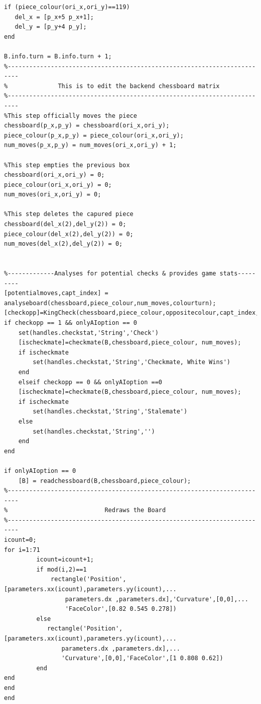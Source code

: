 \documentclass[11pt,a4paper]{article}
\begin{document}
\begin{lstlisting}
if (piece_colour(ori_x,ori_y)==119)    
   del_x = [p_x+5 p_x+1];
   del_y = [p_y+4 p_y];
end
            
B.info.turn = B.info.turn + 1;
%-------------------------------------------------------------------------
%              This is to edit the backend chessboard matrix
%-------------------------------------------------------------------------
%This step officially moves the piece
chessboard(p_x,p_y) = chessboard(ori_x,ori_y);
piece_colour(p_x,p_y) = piece_colour(ori_x,ori_y);
num_moves(p_x,p_y) = num_moves(ori_x,ori_y) + 1;

%This step empties the previous box
chessboard(ori_x,ori_y) = 0;
piece_colour(ori_x,ori_y) = 0;
num_moves(ori_x,ori_y) = 0;

%This step deletes the capured piece
chessboard(del_x(2),del_y(2)) = 0;
piece_colour(del_x(2),del_y(2)) = 0;
num_moves(del_x(2),del_y(2)) = 0;


%-------------Analyses for potential checks & provides game stats---------
[potentialmoves,capt_index] = analyseboard(chessboard,piece_colour,num_moves,colourturn);
[checkopp]=KingCheck(chessboard,piece_colour,oppositecolour,capt_index,potentialmoves);
if checkopp == 1 && onlyAIoption == 0
    set(handles.checkstat,'String','Check')
    [ischeckmate]=checkmate(B,chessboard,piece_colour, num_moves);
    if ischeckmate
        set(handles.checkstat,'String','Checkmate, White Wins')
    end
    elseif checkopp == 0 && onlyAIoption ==0
    [ischeckmate]=checkmate(B,chessboard,piece_colour, num_moves);
    if ischeckmate
        set(handles.checkstat,'String','Stalemate')
    else
        set(handles.checkstat,'String','')
    end
end

if onlyAIoption == 0
    [B] = readchessboard(B,chessboard,piece_colour);
%-------------------------------------------------------------------------
%                           Redraws the Board
%-------------------------------------------------------------------------
icount=0;
for i=1:71
         icount=icount+1;
         if mod(i,2)==1
             rectangle('Position',[parameters.xx(icount),parameters.yy(icount),...
                 parameters.dx ,parameters.dx],'Curvature',[0,0],...
                 'FaceColor',[0.82 0.545 0.278])
         else
            rectangle('Position',[parameters.xx(icount),parameters.yy(icount),...
                parameters.dx ,parameters.dx],...
                'Curvature',[0,0],'FaceColor',[1 0.808 0.62])             
         end
end
end
end
\end{lstlisting}
\end{document}

